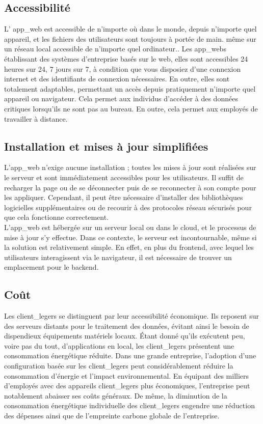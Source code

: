 \documentclass[a4paper, 12pt, french]{article}
\begin{document}
			\subsection{Accessibilité}
				L' \gls{app_web} est accessible de n'importe où dans le monde, depuis n'importe quel appareil, et les fichiers des utilisateurs sont toujours à portée de main. même sur un réseau local accessible de n'importe quel ordinateur..
Les \glspl{app_web} établissant des systèmes d’entreprise basés sur le web, elles sont accessibles 24 heures sur 24, 7 jours sur 7, à condition que vous disposiez d’une connexion internet et des identifiants de connexion nécessaires. En outre, elles sont totalement adaptables, permettant un accès depuis pratiquement n’importe quel appareil ou navigateur. Cela permet aux individus d’accéder à des données critiques lorsqu’ils ne sont pas au bureau. En outre, cela permet aux employés de travailler à distance.
			\newpage
			\subsection{Installation et mises à jour simplifiées}
				L'\gls{app_web} n'exige aucune installation ; toutes les mises à jour sont réalisées sur le serveur et sont immédiatement accessibles pour les utilisateurs. Il suffit de recharger la page ou de se déconnecter puis de se reconnecter à son compte pour les appliquer. Cependant, il peut être nécessaire d'installer des bibliothèques logicielles supplémentaires ou de recourir à des protocoles réseau sécurisés pour que cela fonctionne correctement.\\

				L'\gls{app_web} est hébergée sur un serveur local ou dans le cloud, et le processus de mise à jour s'y effectue. Dans ce contexte, le serveur est incontournable, même si la solution est relativement simple. En effet, en plus du \gls{frontend}, avec lequel les utilisateurs interagissent via le navigateur, il est nécessaire de trouver un emplacement pour le \gls{backend}.
			
			\subsection{Coût}
				Les \glspl{client_leger} se distinguent par leur accessibilité économique. Ils reposent sur des serveurs distants pour le traitement des données, évitant ainsi le besoin de dispendieux équipements matériels locaux. Étant donné qu'ils exécutent peu, voire pas du tout, d'applications en local, les \glspl{client_leger} présentent une consommation énergétique réduite. Dans une grande entreprise, l'adoption d'une configuration basée sur les \glspl{client_leger} peut considérablement réduire la consommation d'énergie et l'impact environnemental. En équipant des milliers d'employés avec des appareils \glspl{client_leger} plus économiques, l'entreprise peut notablement abaisser ses coûts généraux. De même, la diminution de la consommation énergétique individuelle des \glspl{client_leger} engendre une réduction des dépenses ainsi que de l'empreinte carbone globale de l'entreprise.
			\newpage
\end{document}
